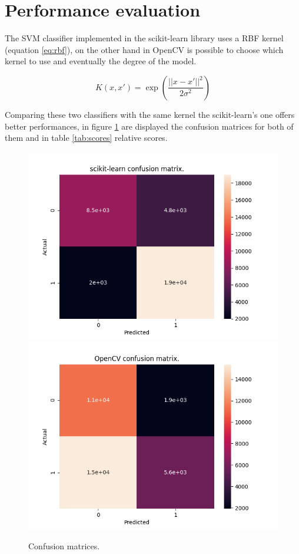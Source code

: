 \section{Performance evaluation}
The SVM classifier implemented in the scikit-learn library uses a RBF kernel (equation \ref{eq:rbf}), on the other hand in OpenCV is possible to choose which kernel to use and eventually the degree of the model. 

\begin{equation} \label{eq:rbf}
    K(x,x') = \exp \left(\frac{||x-x'||^2}{2\sigma^2}\right)
\end{equation}

Comparing these two classifiers with the same kernel the scikit-learn's one offers better performances, in figure \ref{fig:confusion} are displayed the confusion matrices for both of them and in table \ref{tab:scores} relative scores. 

\begin{figure}[h!t]
    \centering
    \includegraphics[scale=0.6]{images/confusion_skl.png}
    \includegraphics[scale=0.6]{images/confusion_cv2.png}
    \caption{Confusion matrices.}
    \label{fig:confusion}
\end{figure}


